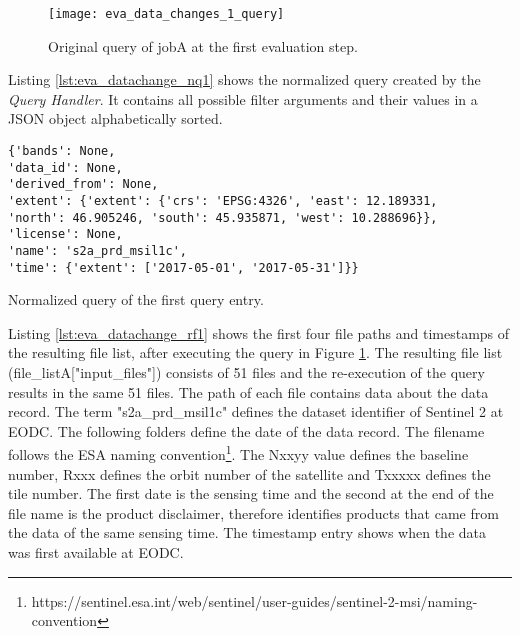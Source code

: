\documentclass[draft,final]{vutinfth} %
\newenvironment{code}{\captionsetup{type=listing}}{}
\begin{document}
\begin{enumerate}
	\begin{figure}[h]
		\centering
		\texttt{[image: eva\_data\_changes\_1\_query]}
		\caption{Original query of jobA at the first evaluation step.}
		\label{fig:eva_data_changes_1_query} %
	\end{figure}
	
	Listing \ref{lst:eva_datachange_nq1} shows the normalized query created by the \textit{Query Handler}. It contains all possible filter arguments and their values in a JSON object alphabetically sorted.
	
	\begin{code}
		\begin{verbatim}
{'bands': None, 
'data_id': None, 
'derived_from': None, 
'extent': {'extent': {'crs': 'EPSG:4326', 'east': 12.189331, 
'north': 46.905246, 'south': 45.935871, 'west': 10.288696}}, 
'license': None, 
'name': 's2a_prd_msil1c', 
'time': {'extent': ['2017-05-01', '2017-05-31']}}
		\end{verbatim}
		\caption{Normalized query of the first query entry.}
		\label{lst:eva_datachange_nq1}
	\end{code}
	
	Listing \ref{lst:eva_datachange_rf1} shows the first four file paths and timestamps of the resulting file list, after executing the query in Figure \ref{fig:eva_data_changes_1_query}. The resulting file list (file\_listA["input\_files"]) consists of 51 files and the re-execution of the query results in the same 51 files. The path of each file contains data about the data record. The term "s2a\_prd\_msil1c" defines the dataset identifier of Sentinel 2 at EODC. The following folders define the date of the data record. The filename follows the ESA naming convention\footnote{https://sentinel.esa.int/web/sentinel/user-guides/sentinel-2-msi/naming-convention}. The Nxxyy value defines the baseline number, Rxxx defines the orbit number of the satellite and Txxxxx defines the tile number. The first date is the sensing time and the second at the end of the file name is the product disclaimer, therefore identifies products that came from the data of the same sensing time. The timestamp entry shows when the data was first available at EODC.
	

\end{enumerate}
\end{document}
